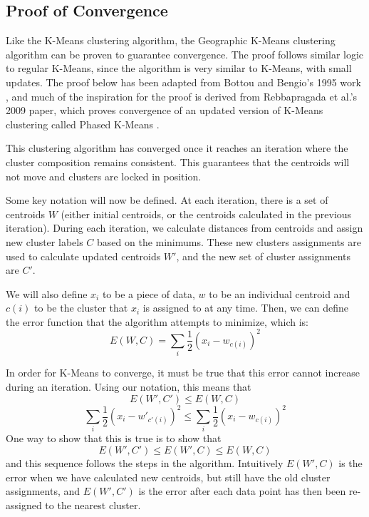 \documentclass[times new roman,12pt]{article}
\begin{document}
\subsection{Proof of Convergence}

Like the K-Means clustering algorithm, the Geographic K-Means clustering algorithm can be proven to guarantee convergence. The proof follows similar logic to regular K-Means, since the algorithm is very similar to K-Means, with small updates. The proof below has been adapted from Bottou and Bengio's 1995 work \cite{bottou1995convergence}, and much of the inspiration for the proof is derived from Rebbapragada et al.'s 2009 paper, which proves convergence of an updated version of K-Means clustering called Phased K-Means \cite{RebbapragadaUmaa2009Fapt}.

This clustering algorithm has converged once it reaches an iteration where the cluster composition remains consistent. This guarantees that the centroids will not move and clusters are locked in position.

Some key notation will now be defined. At each iteration, there is a set of centroids $W$ (either initial centroids, or the centroids calculated in the previous iteration). During each iteration, we calculate distances  from centroids and assign new cluster labels $C$ based on the minimums. These new clusters assignments are used to calculate updated centroids $W'$, and the new set of cluster assignments are $C'$. 

We will also define $x_i$ to be a piece of data, $w$ to be an individual centroid and $c(i)$ to be the cluster that $x_i$ is assigned to at any time. Then, we can define the error function that the algorithm attempts to minimize, which is:
$$E(W,C)=\sum_i{\frac{1}{2}(x_i-w_{c(i)})^2}$$


In order for K-Means to converge, it must be true that this error cannot increase during an iteration. Using our notation, this means that $$E(W',C')\leq{E(W,C)}$$ $$\sum_i{\frac{1}{2}(x_i-w'_{c'(i)})^2} \leq \sum_i{\frac{1}{2}(x_i-w_{c(i)})^2}$$ One way to show that this is true is to show that $$E(W',C')\leq{E(W',C)}\leq{E(W,C)}$$ and this sequence follows the steps in the algorithm. Intuitively $E(W',C)$ is the error when we have calculated new centroids, but still have the old cluster assignments, and $E(W',C')$ is the error after each data point has then been re-assigned to the nearest cluster.
\end{document}
